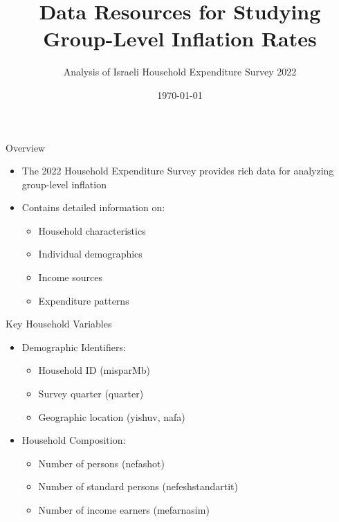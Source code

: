 \documentclass{beamer}
\title{Data Resources for Studying Group-Level Inflation Rates}
\author{Analysis of Israeli Household Expenditure Survey 2022}
\date{\today}
\begin{document}
\begin{frame}
    \titlepage
\end{frame}

\begin{frame}{Overview}
    \begin{itemize}
        \item The 2022 Household Expenditure Survey provides rich data for analyzing group-level inflation
        \item Contains detailed information on:
              \begin{itemize}
                  \item Household characteristics
                  \item Individual demographics
                  \item Income sources
                  \item Expenditure patterns
              \end{itemize}
    \end{itemize}
\end{frame}

\begin{frame}{Key Household Variables}
    \begin{itemize}
        \item Demographic Identifiers:
              \begin{itemize}
                  \item Household ID (misparMb)
                  \item Survey quarter (quarter)
                  \item Geographic location (yishuv, nafa)
              \end{itemize}
        \item Household Composition:
              \begin{itemize}
                  \item Number of persons (nefashot)
                  \item Number of standard persons (nefeshstandartit)
                  \item Number of income earners (mefarnasim)
              \end{itemize}
    \end{itemize}
\end{frame}
\end{document}
